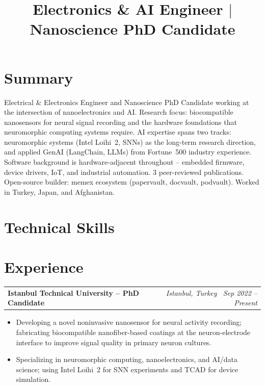 \documentclass[10.5pt, letterpaper]{moderncv}
\title{Electronics \& AI Engineer $|$ Nanoscience PhD Candidate}
\makeatletter
\newcommand{\cvexp}[4]{%
  \vspace{3pt}\par\noindent
  \begin{tabular*}{\textwidth}{@{}l@{\extracolsep{\fill}}r@{}}
    \textbf{#1} & \small\textit{#2 \textendash\ #3}\\
  \end{tabular*}\vspace{-4pt}
  #4\vspace{1pt}%
}
\makeatother
\begin{document}
\makecvtitle
\vspace{-18pt}

\section{Summary}
Electrical \& Electronics Engineer and Nanoscience PhD Candidate working at the intersection of nanoelectronics and AI. Research focus: biocompatible nanosensors for neural signal recording and the hardware foundations that neuromorphic computing systems require. AI expertise spans two tracks: neuromorphic systems (Intel Loihi~2, SNNs) as the long-term research direction, and applied GenAI (LangChain, LLMs) from Fortune~500 industry experience. Software background is hardware-adjacent throughout -- embedded firmware, device drivers, IoT, and industrial automation. 3 peer-reviewed publications. Open-source builder: memex ecosystem (papervault, docvault, podvault). Worked in Turkey, Japan, and Afghanistan.

\section{Technical Skills}

\section{Experience}

\cvexp{Istanbul Technical University -- PhD Candidate}{Istanbul, Turkey}{Sep 2022 -- Present}{
  \begin{itemize}
    \item Developing a novel noninvasive nanosensor for neural activity recording; fabricating biocompatible nanofiber-based coatings at the neuron-electrode interface to improve signal quality in primary neuron cultures.
    \item Specializing in neuromorphic computing, nanoelectronics, and AI/data science; using Intel Loihi~2 for SNN experiments and TCAD for device simulation.
  \end{itemize}
}
\end{document}
